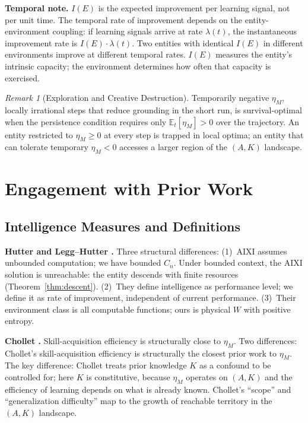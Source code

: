 \documentclass[11pt]{article}
\theoremstyle{definition}
\theoremstyle{remark}
\newtheorem{remark}{Remark}
\begin{document}
\textbf{Temporal note.} $I(E)$ is the expected improvement per learning
signal, not per unit time. The temporal rate of improvement depends on
the entity-environment coupling: if learning signals arrive at rate
$\lambda(t)$, the instantaneous improvement rate is
$I(E) \cdot \lambda(t)$. Two entities with identical $I(E)$ in different
environments improve at different temporal rates. $I(E)$ measures the
entity's intrinsic capacity; the environment determines how often that
capacity is exercised.

\begin{remark}[Exploration and Creative Destruction]
\label{rem:exploration}
Temporarily negative $\eta_M$, locally irrational steps that reduce
grounding in the short run, is survival-optimal when the persistence
condition requires only $\mathbb{E}_t[\eta_M] > 0$ over the trajectory.
An entity restricted to $\eta_M \geq 0$ at every step is trapped in
local optima; an entity that can tolerate temporary $\eta_M < 0$
accesses a larger region of the $(A, K)$ landscape.
\end{remark}

\section{Engagement with Prior Work}
\label{sec:prior}

\subsection{Intelligence Measures and Definitions}

\textbf{Hutter \cite{Hutter2005} and Legg--Hutter \cite{LeggHutter2007}.}
Three structural differences: (1)~AIXI assumes unbounded computation;
we have bounded $C_n$. Under bounded context, the AIXI solution is
unreachable: the entity descends with finite resources
(Theorem~\ref{thm:descent}). (2)~They define intelligence as
performance level; we define it as rate of improvement, independent of
current performance. (3)~Their environment class is all computable
functions; ours is physical $W$ with positive entropy.

\textbf{Chollet \cite{Chollet2019}.}
Skill-acquisition efficiency is structurally close to $\eta_M$. Two
differences: Chollet's skill-acquisition efficiency is structurally the closest prior work to $\eta_M$. The key difference: Chollet treats prior knowledge $K$ as a confound to be
controlled for; here $K$ is constitutive, because $\eta_M$ operates
on $(A, K)$ and the efficiency of learning depends on what is already
known. Chollet's ``scope'' and ``generalization difficulty'' map to the
growth of reachable territory in the $(A, K)$ landscape.
\end{document}
